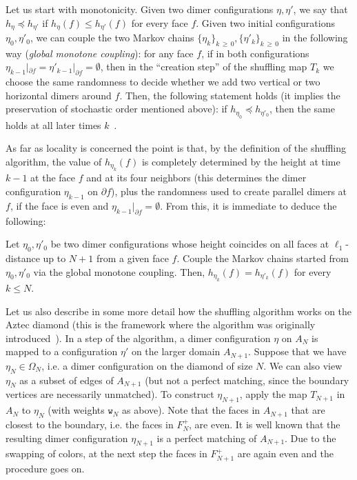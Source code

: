 \documentclass[AHL,Unicode,longabstracts,published]{cedram}
\newcommand{\ttw}{\mathtt{w}}
\newcommand{\ttw}{\mathtt{w}}
\begin{document}
Let us start with monotonicity. Given two dimer configurations $\eta,\eta'$, we say that $h_\eta\preceq h_{\eta'}$ if $h_\eta(f)\leq h_{\eta'}(f)$ for every face $f$. Given two initial configurations $\eta_0,\eta'_0$, we can couple the two Markov chains $\{\eta_k\}_{k\,\ge\,0}, \{\eta'_k\}_{k\,\ge\,0}$ in the following way (\emph{global monotone coupling}): for any face $f$, if in both configurations $\eta_{k-1}|_{\partial f}=\eta'_{k-1}|_{\partial f}=\emptyset$, then in the ``creation step'' of the shuffling map $T_k$ we choose the same randomness to decide whether we add two vertical or two horizontal dimers around $f$. Then, the following statement holds (it implies the preservation of stochastic order mentioned above): if $h_{\eta_0}\preceq h_{\eta'_0}$, then the same holds at all later times $k$~\cite[Lemma~2.4]{zhang2018domino}.

As far as locality is concerned the point is that, by the definition of the shuffling algorithm, the value of $h_{\eta_k}(f)$ is completely determined by the height at time $k-1$ at the face $f$ and at its four neighbors (this determines the dimer configuration $\eta_{k-1}$ on $\partial f$), plus the randomness used to create parallel dimers at $f$, if the face is even and $\eta_{k-1}|_{\partial f}=\emptyset $. From this, it is immediate to deduce the following:
\begin{prop}\label{prop:loc}
Let $\eta_0,\eta'_0$ be two dimer configurations whose height coincides on all faces at $\ell_1$-distance up to $N+1$ from a given face $f$. Couple the Markov chains started from $\eta_0,\eta'_0$ via the global monotone coupling. Then, $h_{\eta_k}(f)=h_{\eta'_k}(f)$ for every $k\le N$.
\end{prop}

Let us also describe in some more detail how the shuffling algorithm works on the Aztec diamond (this is the framework where the algorithm was originally introduced~\cite{EKLP92,EKLP92b,Pro03}). In a step of the algorithm, a dimer configuration $\eta$ on $A_N$ is mapped to a configuration $\eta'$ on the larger domain $A_{N+1}$. Suppose that we have $\eta_{N}\in\Omega_{N}$, i.e. a dimer configuration on the diamond of size $N$. We can also view $\eta_{N}$ as a subset of edges of $A_{N+1}$ (but not a perfect matching, since the boundary vertices are necessarily unmatched). To construct $\eta_{N+1}$, apply the map $T_{N+1}$ in $A_N$ to $\eta_{N}$ (with weights $\ttw_N$ as above). Note that the faces in $A_{N+1}$ that are closest to the boundary, i.e. the faces in $F^+_{N}$, are even. It is well known that the resulting dimer configuration $\eta_{N+1}$ is a perfect matching of $A_{N+1}$. Due to the swapping of colors, at the next step the faces in $F^+_{N+1}$ are again even and the procedure goes on.
\end{document}
